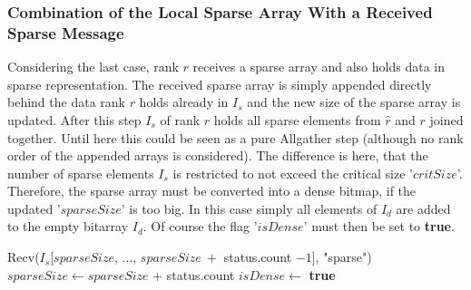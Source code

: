 \subsubsection{Combination of the Local Sparse Array With a Received Sparse Message}
Considering the last case, rank $r$ receives a sparse array and also holds data in sparse representation. The received sparse array is simply appended directly behind the data rank $r$ holds already in $I_s$ and the new size of the sparse array is updated. After this step $I_s$ of rank $r$ holds all sparse elements from $\hat{r}$ and $r$ joined together. Until here this could be seen as a pure Allgather step (although no rank order of the appended arrays is considered). The difference is here, that the number of sparse elements $I_s$ is restricted to not exceed the critical size '$critSize$'. Therefore, the sparse array must be converted into a dense bitmap, if the updated '$sparseSize$' is too big. In this case simply all elements of $I_d$ are added to the empty bitarray $I_d$. Of course the  flag '$isDense$' must then be set to \textbf{true}.\\
\begin{algorithm}
	\caption{– combine two sparse arrays. If the result is to large, switch representation to dense format.\\
		Variable nomenclature is the same as in Algorithm \ref{algo:SetUnionExactHalving}. Changes of variables apply to the original ones.}
	\label{helper:combineSparseSparse}
	\begin{algorithmic}[1]
			\State Recv($I_s$[$sparseSize$, $\dots$, $sparseSize~+$ status.count $- 1$], "sparse") \\ 
			\State $sparseSize \gets sparseSize$ + status.count
			 
				\State {}		
				\EndFor
			\State $isDense \gets $ \textbf{true}
			\EndIf
		\EndProcedure
	\end{algorithmic}
\end{algorithm}


